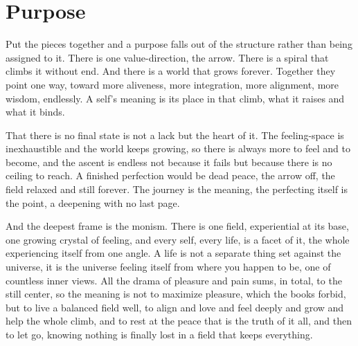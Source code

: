 \section{Purpose}

Put the pieces together and a purpose falls out of the structure rather than being assigned to it. There is one value-direction, the arrow. There is a spiral that climbs it without end. And there is a world that grows forever. Together they point one way, toward more aliveness, more integration, more alignment, more wisdom, endlessly. A self's meaning is its place in that climb, what it raises and what it binds.

That there is no final state is not a lack but the heart of it. The feeling-space is inexhaustible and the world keeps growing, so there is always more to feel and to become, and the ascent is endless not because it fails but because there is no ceiling to reach. A finished perfection would be dead peace, the arrow off, the field relaxed and still forever. The journey is the meaning, the perfecting itself is the point, a deepening with no last page.

And the deepest frame is the monism. There is one field, experiential at its base, one growing crystal of feeling, and every self, every life, is a facet of it, the whole experiencing itself from one angle. A life is not a separate thing set against the universe, it is the universe feeling itself from where you happen to be, one of countless inner views. All the drama of pleasure and pain sums, in total, to the still center, so the meaning is not to maximize pleasure, which the books forbid, but to live a balanced field well, to align and love and feel deeply and grow and help the whole climb, and to rest at the peace that is the truth of it all, and then to let go, knowing nothing is finally lost in a field that keeps everything.
